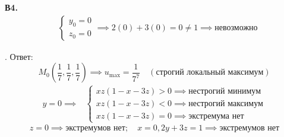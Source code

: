 \documentclass[12pt]{article}
\begin{document}
\noindent \textbf{В4.}
\begin{align*}
&\begin{cases} y_0 = 0 \\ z_0 = 0 \end{cases} \implies 2(0)+3(0)=0 \neq 1 \implies \text{невозможно}
\end{align*}

\vspace{0.5cm}
. Ответ:
\[
M_0 \left( \frac{1}{7}, \frac{1}{7}, \frac{1}{7} \right) \implies u_{\max} = \frac{1}{7^7} \quad (\text{строгий локальный максимум})
\]
\begin{align*}
y = 0 \implies &\begin{cases} x z (1 - x - 3z) > 0 \implies \text{нестрогий минимум} \\ x z (1 - x - 3z) < 0 \implies \text{нестрогий максимум} \\ x z (1 - x - 3z) = 0 \implies \text{экстремума нет} \end{cases}
\end{align*}
\[
z = 0 \implies \text{экстремумов нет}; \quad x = 0, 2y + 3z = 1 \implies \text{экстремумов нет}
\]
\end{document}
